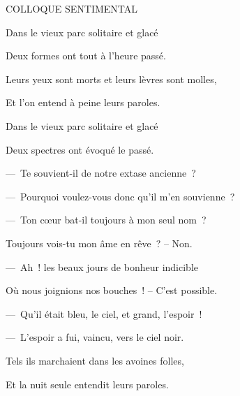 
{\begin{center}COLLOQUE SENTIMENTAL\end{center}

\setlength{\parskip}{0pt}

\bigskip

Dans le vieux parc solitaire et glacé

Deux formes ont tout à l'heure passé.

\medskip

Leurs yeux sont morts et leurs lèvres sont molles,

Et l'on entend à peine leurs paroles.

\medskip

Dans le vieux parc solitaire et glacé

Deux spectres ont évoqué le passé.

\medskip

—~Te souvient-il de notre extase ancienne~?

—~Pourquoi voulez-vous donc qu'il m'en souvienne~?

\medskip

—~Ton cœur bat-il toujours à mon seul nom~?

Toujours vois-tu mon âme en rêve~? – Non.

\medskip

—~Ah~! les beaux jours de bonheur indicible

Où nous joignions nos bouches~! – C'est possible.

\medskip

—~Qu'il était bleu, le ciel, et grand, l'espoir~!

—~L'espoir a fui, vaincu, vers le ciel noir.

\medskip

Tels ils marchaient dans les avoines folles,

Et la nuit seule entendit leurs paroles.

\setlength{\parskip}{6pt}
}

